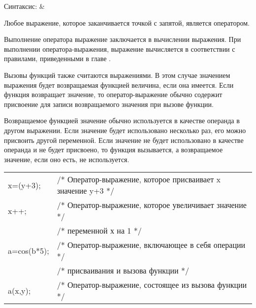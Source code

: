 \renewcommand{\arraystretch}{1.2} %
\renewcommand{\tabcolsep}{0.2cm}   %
\begin{pHeader}
Синтаксис:      & \\
\end{pHeader}

Любое выражение, которое заканчивается точкой с запятой, является оператором. 

Выполнение оператора выражение заключается в вычислении выражения. При выполнении оператора-выражения, выражение вычисляется в соответствии с правилами, приведенными в главе . \killoverfullbefore

Вызовы функций также считаются выражениями. В этом случае значением выражения будет возвращаемая функцией величина, если она имеется. Если функция возвращает значение, то оператор-выражение обычно содержит присвоение для записи возвращаемого значения при вызове функции. \killoverfullbefore

Возвращаемое функцией значение обычно используется в качестве операнда в другом выражении. Если значение будет использовано несколько раз, его можно присвоить другой переменной. Если значение не будет использовано в качестве операнда и не будет присвоено, то функция вызывается, а возвращаемое значение, если оно есть, не используется. \killoverfullbefore \BL

\begin{pExample}
\begin{tabular}{ l l }
x=(y+3);  & \textcolor{exComm}{/* Оператор-выражение, которое присваивает x значение y+3 */} \\
x++; & \textcolor{exComm}{/* Оператор-выражение, которое увеличивает значение */} \\
 & \textcolor{exComm}{/* переменной х на 1 */} \\
a=cos(b*5); & \textcolor{exComm}{/* Оператор-выражение, включающее в себя операции */} \\
 & \textcolor{exComm}{/* присваивания и вызова функции */} \\
a(x,y);  & \textcolor{exComm}{/* Оператор-выражение, состоящее из вызова функции */} \\
\end{tabular}
\end{pExample}

